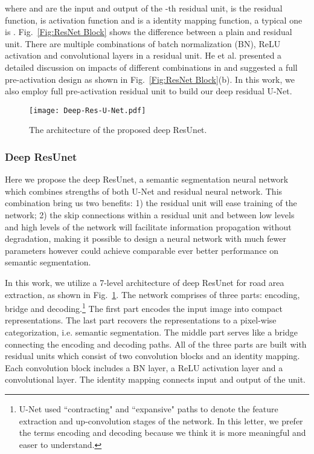 \documentclass[journal]{IEEEtran}
\begin{document}
where  and  are the input and output of the -th residual unit,  is the residual function,  is activation function and  is a identity mapping function, a typical one is  . Fig.~\ref{Fig:ResNet Block} shows the difference between a plain and residual unit. There are multiple combinations of batch normalization (BN), ReLU activation and convolutional layers in a residual unit. He et al. presented a detailed discussion on impacts of different combinations in \cite{resnet2016} and suggested a full pre-activation design as shown in  Fig.~\ref{Fig:ResNet Block}(b). In this work, we also employ full pre-activation residual unit to build our deep residual U-Net. 
\begin{figure}[tbp!]
	\begin{center}
		\texttt{[image: Deep-Res-U-Net.pdf]}
		\caption{The architecture of the proposed deep ResUnet.}
		\label{Fig:Deep Res-U-Net}
	\end{center}
	\vspace{-0.7cm}
\end{figure}

\subsubsection{Deep ResUnet}
Here we propose the deep ResUnet, a semantic segmentation neural network which combines strengths of both U-Net and residual neural network. This combination bring us two benefits: 1) the residual unit will ease training of the network; 2) the skip connections within a residual unit and between low levels and high levels of the network will facilitate information propagation without degradation, making it possible to design a neural network with much fewer parameters however could achieve comparable ever better performance on semantic segmentation. 

In this work, we utilize a 7-level architecture of deep ResUnet for road area extraction, as shown in Fig.~\ref{Fig:Deep Res-U-Net}. The network comprises of three parts: encoding, bridge and decoding.\footnote{U-Net used  ``contracting" and ``expansive" paths to denote the feature extraction and up-convolution stages of the network. In this letter, we prefer the terms encoding and decoding because we think it is more meaningful and easer to understand.} The first part encodes the input image into compact representations. The last part recovers the representations to a pixel-wise categorization, i.e. semantic segmentation. The middle part serves like a bridge connecting the encoding and decoding paths. All of the three parts are built with residual units which consist of two  convolution blocks and an identity mapping. Each convolution block includes a BN layer, a ReLU activation layer and a convolutional layer. The identity mapping connects input and output of the unit. 
\end{document}
